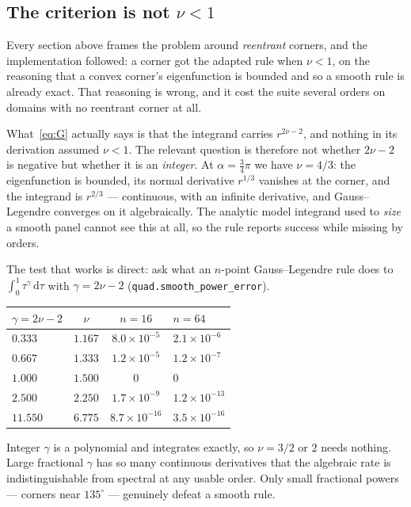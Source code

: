 \documentclass[11pt]{article}
\theoremstyle{remark}
\newcommand{\dd}{\,\mathrm{d}}
\begin{document}
\subsection{The criterion is not $\nu<1$}\label{sec:criterion}

Every section above frames the problem around \emph{reentrant} corners, and the
implementation followed: a corner got the adapted rule when $\nu<1$, on the
reasoning that a convex corner's eigenfunction is bounded and so a smooth rule is
already exact. That reasoning is wrong, and it cost the suite several orders on
domains with no reentrant corner at all.

What~\eqref{eq:G} actually says is that the integrand carries $r^{2\nu-2}$, and
nothing in its derivation assumed $\nu<1$. The relevant question is therefore not
whether $2\nu-2$ is negative but whether it is an \emph{integer}. At
$\alpha=\frac34\pi$ we have $\nu=4/3$: the eigenfunction is bounded, its normal
derivative $r^{1/3}$ vanishes at the corner, and the integrand is $r^{2/3}$ ---
continuous, with an infinite derivative, and Gauss--Legendre converges on it
algebraically. The analytic model integrand used to \emph{size} a smooth panel
cannot see this at all, so the rule reports success while missing by orders.

The test that works is direct: ask what an $n$-point Gauss--Legendre rule does to
$\int_0^1\tau^{\gamma}\dd\tau$ with $\gamma=2\nu-2$ (\verb|quad.smooth_power_error|).
\medskip

\begin{center}
\begin{tabular}{lccl}
\toprule
$\gamma=2\nu-2$ & $\nu$ & $n=16$ & $n=64$ \\
\midrule
$0.333$  & $1.167$ & $8.0\times10^{-5}$ & $2.1\times10^{-6}$ \\
$0.667$  & $1.333$ & $1.2\times10^{-5}$ & $1.2\times10^{-7}$ \\
$1.000$  & $1.500$ & $0$                & $0$ \\
$2.500$  & $2.250$ & $1.7\times10^{-9}$ & $1.2\times10^{-13}$ \\
$11.550$ & $6.775$ & $8.7\times10^{-16}$& $3.5\times10^{-16}$ \\
\bottomrule
\end{tabular}
\end{center}
\medskip

\noindent
Integer $\gamma$ is a polynomial and integrates exactly, so $\nu=3/2$ or $2$ needs
nothing. Large fractional $\gamma$ has so many continuous derivatives that the
algebraic rate is indistinguishable from spectral at any usable order. Only small
fractional powers --- corners near $135^\circ$ --- genuinely defeat a smooth rule.
\end{document}
